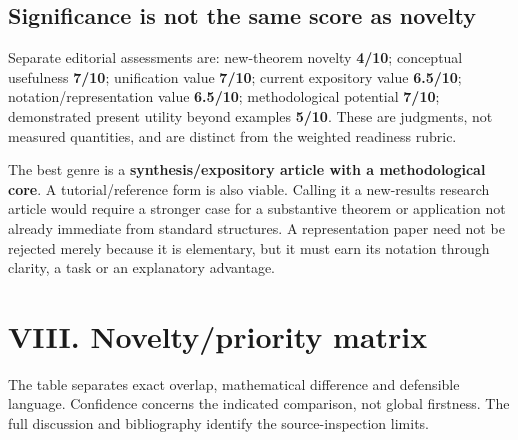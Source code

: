 \documentclass[
  10pt,
]{article}
\begin{document}
\subsection{Significance is not the same score as
novelty}\label{significance-is-not-the-same-score-as-novelty}

Separate editorial assessments are: new-theorem novelty \textbf{4/10};
conceptual usefulness \textbf{7/10}; unification value \textbf{7/10};
current expository value \textbf{6.5/10}; notation/representation value
\textbf{6.5/10}; methodological potential \textbf{7/10}; demonstrated
present utility beyond examples \textbf{5/10}. These are judgments, not
measured quantities, and are distinct from the weighted readiness
rubric.

The best genre is a \textbf{synthesis/expository article with a
methodological core}. A tutorial/reference form is also viable. Calling
it a new-results research article would require a stronger case for a
substantive theorem or application not already immediate from standard
structures. A representation paper need not be rejected merely because
it is elementary, but it must earn its notation through clarity, a task
or an explanatory advantage.

\section{VIII. Novelty/priority
matrix}\label{viii.-noveltypriority-matrix}

The table separates exact overlap, mathematical difference and
defensible language. Confidence concerns the indicated comparison, not
global firstness. The full discussion and bibliography identify the
source-inspection limits.
\end{document}
